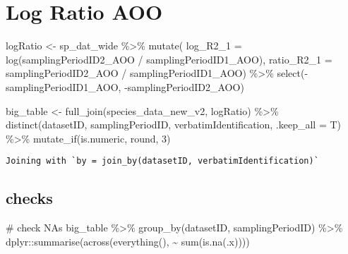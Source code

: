 \documentclass[
  letterpaper,
  DIV=11,
  numbers=noendperiod]{scrreprt}
\newenvironment{Shaded}{\begin{snugshade}}{\end{snugshade}}
\newcommand{\AttributeTok}[1]{\textcolor[rgb]{0.40,0.45,0.13}{#1}}
\newcommand{\CommentTok}[1]{\textcolor[rgb]{0.37,0.37,0.37}{#1}}
\newcommand{\DecValTok}[1]{\textcolor[rgb]{0.68,0.00,0.00}{#1}}
\newcommand{\FunctionTok}[1]{\textcolor[rgb]{0.28,0.35,0.67}{#1}}
\newcommand{\NormalTok}[1]{\textcolor[rgb]{0.00,0.23,0.31}{#1}}
\newcommand{\OtherTok}[1]{\textcolor[rgb]{0.00,0.23,0.31}{#1}}
\newcommand{\SpecialCharTok}[1]{\textcolor[rgb]{0.37,0.37,0.37}{#1}}
\begin{document}
\hypertarget{log-ratio-aoo-1}{%
\section{Log Ratio AOO}\label{log-ratio-aoo-1}}

\begin{Shaded}
\begin{Highlighting}[]
\NormalTok{logRatio }\OtherTok{\textless{}{-}}\NormalTok{ sp\_dat\_wide }\SpecialCharTok{\%\textgreater{}\%}
  \FunctionTok{mutate}\NormalTok{(}
    \AttributeTok{log\_R2\_1 =} \FunctionTok{log}\NormalTok{(samplingPeriodID2\_AOO }\SpecialCharTok{/}\NormalTok{ samplingPeriodID1\_AOO),}
    \AttributeTok{ratio\_R2\_1 =}\NormalTok{ samplingPeriodID2\_AOO }\SpecialCharTok{/}\NormalTok{ samplingPeriodID1\_AOO) }\SpecialCharTok{\%\textgreater{}\%}
  \FunctionTok{select}\NormalTok{(}\SpecialCharTok{{-}}\NormalTok{samplingPeriodID1\_AOO, }\SpecialCharTok{{-}}\NormalTok{samplingPeriodID2\_AOO)}

\NormalTok{big\_table }\OtherTok{\textless{}{-}} \FunctionTok{full\_join}\NormalTok{(species\_data\_new\_v2, logRatio) }\SpecialCharTok{\%\textgreater{}\%}
  \FunctionTok{distinct}\NormalTok{(datasetID, samplingPeriodID, verbatimIdentification, }
           \AttributeTok{.keep\_all =}\NormalTok{ T) }\SpecialCharTok{\%\textgreater{}\%}
  \FunctionTok{mutate\_if}\NormalTok{(is.numeric, round, }\DecValTok{3}\NormalTok{)}
\end{Highlighting}
\end{Shaded}

\begin{verbatim}
Joining with `by = join_by(datasetID, verbatimIdentification)`
\end{verbatim}

\hypertarget{checks}{%
\subsection{checks}\label{checks}}

\begin{Shaded}
\begin{Highlighting}[]
\CommentTok{\# check NAs}
\NormalTok{big\_table }\SpecialCharTok{\%\textgreater{}\%}
  \FunctionTok{group\_by}\NormalTok{(datasetID, samplingPeriodID) }\SpecialCharTok{\%\textgreater{}\%}
\NormalTok{  dplyr}\SpecialCharTok{::}\FunctionTok{summarise}\NormalTok{(}\FunctionTok{across}\NormalTok{(}\FunctionTok{everything}\NormalTok{(), }\SpecialCharTok{\textasciitilde{}} \FunctionTok{sum}\NormalTok{(}\FunctionTok{is.na}\NormalTok{(.x))))}
\end{Highlighting}
\end{Shaded}
\end{document}
